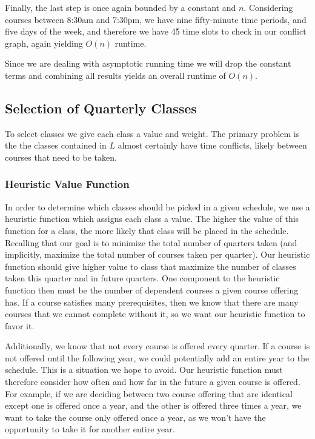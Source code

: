 \documentclass[11pt]{article} %
\begin{document}
Finally, the last step is once again bounded by a constant and $n$. Considering
courses between 8:30am and 7:30pm, we have nine fifty-minute time periods, and
five days of the week, and therefore we have 45 time slots to check in our
conflict graph, again yielding $O(n)$ runtime.

Since we are dealing with asymptotic running time we will drop the constant
terms and combining all results yields an overall runtime of $O(n)$.

\subsection{Selection of Quarterly Classes} To select classes we give each class
a value and weight. The primary problem is the the classes contained in $L$
almost certainly have time conflicts, likely between courses that need to be
taken. 

\subsubsection{Heuristic Value Function} In order to determine which classes
should be picked in a given schedule, we use a heuristic function which assigns
each class a value. The higher the value of this function for a class, the more
likely that class will be placed in the schedule.  Recalling that our goal is to
minimize the total number of quarters taken (and implicitly, maximize the total
number of courses taken per quarter).  Our heuristic function should give higher
value to class that maximize the number of classes taken this quarter and in
future quarters.  One component to the heuristic function then must be the
number of dependent courses a given course offering has. If a course satisfies
many prerequisites, then we know that there are many courses that we cannot
complete without it, so we want our heuristic function to favor it. 

Additionally, we know that not every course is offered every quarter. If
a course is not offered until the following year, we could potentially add an
entire year to the schedule. This is a situation we hope to avoid. Our heuristic
function must therefore consider how often and how far in the future a given
course is offered. For example, if we are deciding between two course offering
that are identical except one is offered once a year, and the other is offered
three times a year, we want to take the course only offered once a year, as we
won't have the opportunity to take it for another entire year.
\end{document}

